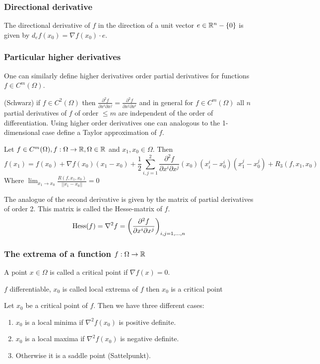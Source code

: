 \documentclass[a4paper]{article}
\begin{document}
\subsubsection{Directional derivative}
The directional derivative of $f$ in the direction of a unit vector $e \in \mathbb{R}^n-\{0\}$ is given by 
$d_ef(x_0)=\nabla f(x_0) \cdot e$. 

\subsubsection{Particular higher derivatives}
One can similarly define higher derivatives order partial derivatives for functions $f \in C^m(\Omega)$.

\begin{fact}{(Schwarz)}
if $f \in C^2(\Omega)$ then $\frac{\partial^2 f}{\partial x^i \partial x^j}=\frac{\partial^2 f}{\partial x^j \partial x^i}$
and in general for $f \in C^m(\Omega)$ all $n$  partial derivatives of $f$ of order $\leq m$ are independent of the order of differentiation.
Using higher order derivatives one can analogous to the 1-dimensional case define a Taylor approximation of $f$.
\end{fact}

\begin{fact}{}
Let $f \in C^m(\Omega), f:\Omega \rightarrow \mathbb{R}, \Omega \in \mathbb{R}$ and $x_1,x_0 \in \Omega$. Then 
$$f(x_1)=f(x_0)+\nabla f(x_0)(x_1-x_0)+\frac{1}{2}\sum_{i,j=1}^2 \frac{\partial^2 f}{\partial x^i \partial x^j}(x_0)(x_i^i-x_0^i)(x_1^j-x_0^j) + R_3(f,x_1,x_0)$$ 
Where $\lim_{x_1 \rightarrow x_0} \frac{R(f,x_1,x_0)}{||x_1-x_0||}=0$
\end{fact}

The analogue of the second derivative is given by the matrix of partial derivatives of order 2. This matrix is called the Hesse-matrix of $f$.
$$\operatorname{Hess}(f)=\nabla^2 f=\left(\frac{\partial^2 f}{\partial x^i \partial x^j}\right)_{i,j=1,...,n}$$

\subsubsection{The extrema of a function $f:\Omega \rightarrow \mathbb{R}$}
\begin{definition}{}
A point $x \in \Omega$ is called a critical point if $\nabla f(x)=0$.
\end{definition}
\begin{fact}{}
$f$ differentiable, $x_0$ is called local extrema of $f$ then $x_0$ is a critical point
\end{fact}
\begin{fact}{}
Let $x_0$ be a critical point of $f$. Then we have three different cases:
\begin{enumerate}
\item $x_0$ is a local minima if $\nabla^2 f(x_0)$ is positive definite.
\item $x_0$ is a local maxima if $\nabla^2 f(x_0)$ is negative definite.
\item Otherwise it is a saddle point (Sattelpunkt).
\end{enumerate}
\end{fact}
\end{document}
